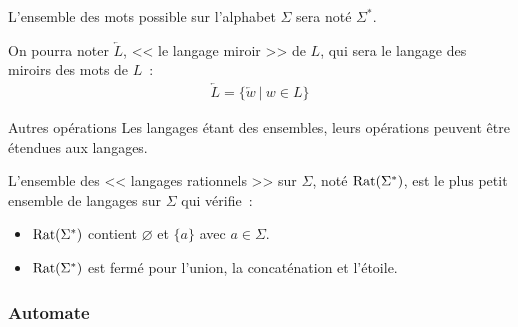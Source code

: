 \begin{frame}{\myframetitle}
  \begin{definition}
    L'ensemble des mots possible sur l'alphabet \(\Sigma\) sera noté
    \(\Sigma^*\).
  \end{definition}

  \pause[]

  \begin{definition}
    On pourra noter \(\overleftarrow L\), << le langage miroir >> de \(L\), qui
    sera le langage des miroirs des mots de \(L\)~:
    \begin{align*}
      \overleftarrow L = \{\overleftarrow w ~|~ w \in L\}
    \end{align*}
  \end{definition}

  \pause[]

  \begin{block}{Autres opérations}
    Les langages étant des ensembles, leurs opérations peuvent être étendues
    aux langages.
  \end{block}
\end{frame}

\begin{frame}{\myframetitle}
  \begin{definition}
    L'ensemble des << langages rationnels >> sur \(\Sigma\), noté
    \(\operatorname*{Rat}(\Sigma^*)\), est le plus petit ensemble de langages sur \(\Sigma\)
    qui vérifie~:

    \vphantom{}

    \begin{itemize}
      \item \(\operatorname*{Rat}(\Sigma^*)\) contient \(\varnothing\) et \(\{a\}\) avec \(a
        \in \Sigma\).
      \item \(\operatorname*{Rat}(\Sigma^*)\) est fermé pour l'union, la concaténation et
        l'étoile.
    \end{itemize}
  \end{definition}
\end{frame}

\subsubsection{Automate}


